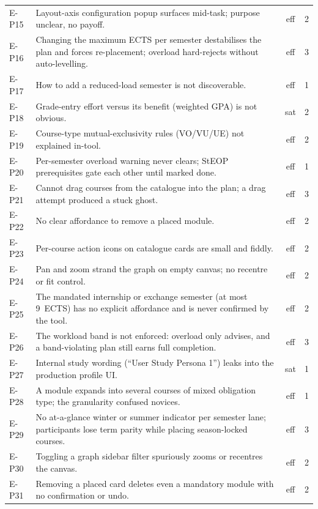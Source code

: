 \begin{longtable}{p{1.6cm}p{9.6cm}cc}
    E-P15 & Layout-axis configuration popup surfaces mid-task; purpose unclear, no payoff. & eff & 2 \\
    E-P16 & Changing the maximum ECTS per semester destabilises the plan and forces re-placement; overload hard-rejects without auto-levelling. & eff & 3 \\
    E-P17 & How to add a reduced-load semester is not discoverable. & eff & 1 \\
    E-P18 & Grade-entry effort versus its benefit (weighted GPA) is not obvious. & sat & 2 \\
    E-P19 & Course-type mutual-exclusivity rules (VO/VU/UE) not explained in-tool. & eff & 2 \\
    E-P20 & Per-semester overload warning never clears; StEOP prerequisites gate each other until marked done. & eff & 1 \\
    E-P21 & Cannot drag courses from the catalogue into the plan; a drag attempt produced a stuck ghost. & eff & 3 \\
    E-P22 & No clear affordance to remove a placed module. & eff & 2 \\
    E-P23 & Per-course action icons on catalogue cards are small and fiddly. & eff & 2 \\
    E-P24 & Pan and zoom strand the graph on empty canvas; no recentre or fit control. & eff & 2 \\
    E-P25 & The mandated internship or exchange semester (at most 9~ECTS) has no explicit affordance and is never confirmed by the tool. & eff & 2 \\
    E-P26 & The workload band is not enforced: overload only advises, and a band-violating plan still earns full completion. & eff & 3 \\
    E-P27 & Internal study wording (\enquote{User Study Persona 1}) leaks into the production profile UI. & sat & 1 \\
    E-P28 & A module expands into several courses of mixed obligation type; the granularity confused novices. & eff & 1 \\
    E-P29 & No at-a-glance winter or summer indicator per semester lane; participants lose term parity while placing season-locked courses. & eff & 3 \\
    E-P30 & Toggling a graph sidebar filter spuriously zooms or recentres the canvas. & eff & 2 \\
    E-P31 & Removing a placed card deletes even a mandatory module with no confirmation or undo. & eff & 2 \\

\end{longtable}
